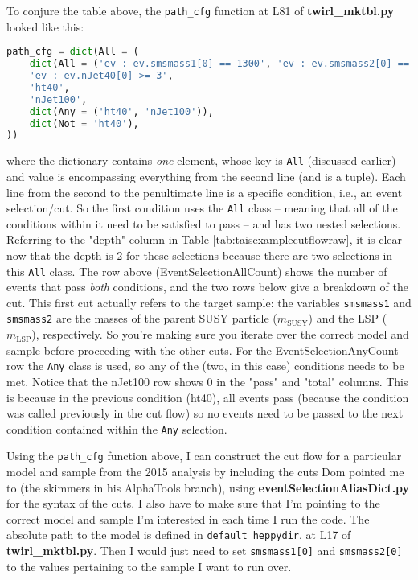 To conjure the table above, the \verb!path_cfg! function at L81 of \textbf{twirl\_mktbl.py} looked like this:

\begin{lstlisting}[belowskip=-0.7cm, language=python, numbers=none]
path_cfg = dict(All = (
	dict(All = ('ev : ev.smsmass1[0] == 1300', 'ev : ev.smsmass2[0] == 1050')),
	'ev : ev.nJet40[0] >= 3',
	'ht40',
	'nJet100',
	dict(Any = ('ht40', 'nJet100')),
	dict(Not = 'ht40'),
))
\end{lstlisting}

where the dictionary contains \emph{one} element, whose key is \verb!All! (discussed earlier) and value is encompassing everything from the second line (and is a tuple). Each line from the second to the penultimate line is a specific condition, i.e., an event selection/cut. So the first condition uses the \verb!All! class -- meaning that all of the conditions within it need to be satisfied to pass -- and has two nested selections. Referring to the "depth" column in Table \ref{tab:taisexamplecutflowraw}, it is clear now that the depth is 2 for these selections because there are two selections in this \verb!All! class. The row above (EventSelectionAllCount) shows the number of events that pass \emph{both} conditions, and the two rows below give a breakdown of the cut. This first cut actually refers to the target sample: the variables \verb!smsmass1! and \verb!smsmass2! are the masses of the parent SUSY particle ($m_{\mathrm{SUSY}}$) and the LSP ($m_{\mathrm{LSP}}$), respectively. So you're making sure you iterate over the correct model and sample before proceeding with the other cuts. For the EventSelectionAnyCount row the \verb!Any! class is used, so any of the (two, in this case) conditions needs to be met. Notice that the nJet100 row shows 0 in the "pass" and "total" columns. This is because in the previous condition (ht40), all events pass (because the condition was called previously in the cut flow) so no events need to be passed to the next condition contained within the \verb!Any! selection.

Using the \verb!path_cfg! function above, I can construct the cut flow for a particular model and sample from the 2015 analysis by including the cuts Dom pointed me to (the skimmers in his AlphaTools branch), using \textbf{eventSelectionAliasDict.py} for the syntax of the cuts. I also have to make sure that I'm pointing to the correct model and sample I'm interested in each time I run the code. The absolute path to the model is defined in \verb!default_heppydir!, at L17 of \textbf{twirl\_mktbl.py}. Then I would just need to set \verb!smsmass1[0]! and \verb!smsmass2[0]! to the values pertaining to the sample I want to run over.

